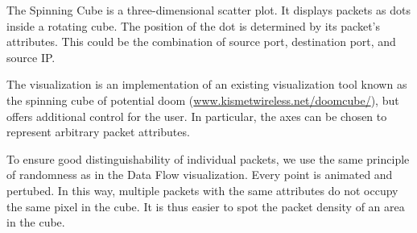 The Spinning Cube is a three-dimensional scatter plot. It displays packets as dots inside a rotating cube. The position of the dot is determined by its packet's attributes. This could be the combination of source port, destination port, and source IP. 

The visualization is an implementation of an existing visualization tool known as the spinning cube of potential doom (\url{www.kismetwireless.net/doomcube/}), but offers additional control for the user. In particular, the axes can be chosen to represent arbitrary packet attributes.

To ensure good distinguishability of individual packets, we use the same principle of randomness as in the Data Flow visualization. Every point is animated and pertubed. In this way, multiple packets with the same attributes do not occupy the same pixel in the cube. It is thus easier to spot the packet density of an area in the cube.